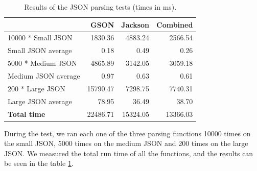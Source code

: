 \begin{table}[h!]
	\captionsetup{justification=centering,margin=0.5cm}
	\bgroup
	\def\arraystretch{1.5}%
	\begin{center}
		\begin{tabular}{ | l | r | r | r | }
			\hline
			& \textbf{GSON} & \textbf{Jackson} & \textbf{Combined} \\ \hline
			10000 * Small JSON & 1830.36 & 4883.24 & 2566.54 \\ \hline	
			Small JSON average & 0.18 & 0.49 & 0.26 \\ \hline	
			5000 * Medium JSON & 4865.89 & 3142.05 & 3059.18 \\ \hline	
			Medium JSON average & 0.97 & 0.63 & 0.61 \\ \hline	
			200 * Large JSON & 15790.47 & 7298.75 & 7740.31 \\ \hline	
			Large JSON average & 78.95 & 36.49 & 38.70 \\ \hline
			\textbf{Total time} & 22486.71 & 15324.05 & 13366.03 \\
			\hline
		\end{tabular}
	\end{center}
	\egroup
	\caption{Results of the JSON parsing tests (times in ms).}
	\label{tab:json_parsing_results}
\end{table}


During the test, we ran each one of the three parsing functions 10000 times on the small JSON, 5000 times on the medium JSON and 200 times on the large JSON. We measured the total run time of all the functions, and the results can be seen in the table \ref{tab:json_parsing_results}.

